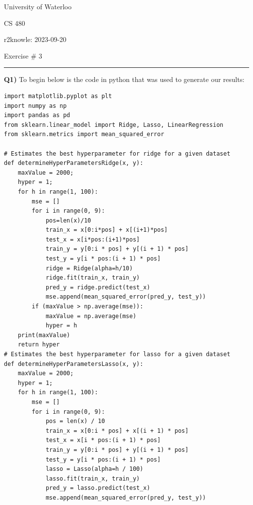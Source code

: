 \documentclass{article}
\begin{document}
\begin{titlepage}
	\setlength{\parindent}{0pt}
	\large

\vspace*{-2cm}



University of Waterloo \par
CS 480 \par
\vspace{0.05cm}
r2knowle: 2023-09-20
\vspace{0.2cm}

{\huge Exercise \# 3 \par}
\hrule

\vspace{0.5cm}
\textbf{Q1)} To begin below is the code in python that was used to generate our results:

\begin{lstlisting}
import matplotlib.pyplot as plt
import numpy as np
import pandas as pd
from sklearn.linear_model import Ridge, Lasso, LinearRegression
from sklearn.metrics import mean_squared_error

# Estimates the best hyperparameter for ridge for a given dataset
def determineHyperParametersRidge(x, y):
    maxValue = 2000;
    hyper = 1;
    for h in range(1, 100):
        mse = []
        for i in range(0, 9):
            pos=len(x)/10
            train_x = x[0:i*pos] + x[(i+1)*pos]
            test_x = x[i*pos:(i+1)*pos]
            train_y = y[0:i * pos] + y[(i + 1) * pos]
            test_y = y[i * pos:(i + 1) * pos]
            ridge = Ridge(alpha=h/10)
            ridge.fit(train_x, train_y)
            pred_y = ridge.predict(test_x)
            mse.append(mean_squared_error(pred_y, test_y))
        if (maxValue > np.average(mse)):
            maxValue = np.average(mse)
            hyper = h
    print(maxValue)
    return hyper
# Estimates the best hyperparameter for lasso for a given dataset
def determineHyperParametersLasso(x, y):
    maxValue = 2000;
    hyper = 1;
    for h in range(1, 100):
        mse = []
        for i in range(0, 9):
            pos = len(x) / 10
            train_x = x[0:i * pos] + x[(i + 1) * pos]
            test_x = x[i * pos:(i + 1) * pos]
            train_y = y[0:i * pos] + y[(i + 1) * pos]
            test_y = y[i * pos:(i + 1) * pos]
            lasso = Lasso(alpha=h / 100)
            lasso.fit(train_x, train_y)
            pred_y = lasso.predict(test_x)
            mse.append(mean_squared_error(pred_y, test_y))


\end{lstlisting}
\end{titlepage}
\end{document}
